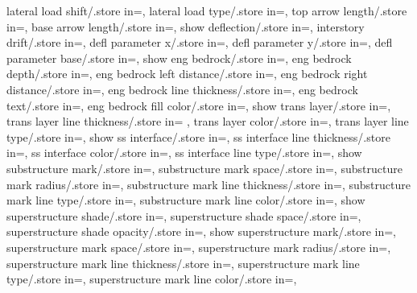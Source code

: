 {  lateral load shift/.store in=\latloadshift,
  lateral load type/.store in=\latloadtype,
  top arrow length/.store in=\toparrlen,
  base arrow length/.store in=\basearrlen,
  show deflection/.store in=\showdefl, 
  interstory drift/.store in=\drift,
  defl parameter x/.store in=,
  defl parameter y/.store in=,
  defl parameter base/.store in=,
  show eng bedrock/.store in=\showengbedrock,
  eng bedrock depth/.store in=\engbedrockdepth,
  eng bedrock left distance/.store in=\engbedrockleftdist,
  eng bedrock right distance/.store in=\engbedrockrightdist,
  eng bedrock line thickness/.store in=\engbedrocklinewidth,
  eng bedrock text/.store in=\engbedrocktext,
  eng bedrock fill color/.store in=\engbedrockfillcolor,
  show trans layer/.store in=\showtranslayer,
  trans layer line thickness/.store in= \translayerlinet,
  trans layer color/.store in=\translayercolor,
  trans layer line type/.store in=\translayerlinetype,
  show ss interface/.store in=\showssinter,
  ss interface line thickness/.store in=\ssinterlinet,
  ss interface color/.store in=\ssintercolor,
  ss interface line type/.store in=\ssinterlinetype,
  show substructure mark/.store in=\showmarkss,
  substructure mark space/.store in=\markssexspace,
  substructure mark radius/.store in=\markssrad,
  substructure mark line thickness/.store in=\marksslinet,
  substructure mark line type/.store in=\marksslinetype,
  substructure mark line color/.store in=\marksslinecolor,
  show superstructure shade/.store in=\showsupershade,
  superstructure shade space/.store in=\supershadespace,
  superstructure shade opacity/.store in=\supershadeopacity,
  show superstructure mark/.store in=\showmarksuper,
  superstructure mark space/.store in=\marksuperexspace,
  superstructure mark radius/.store in=\marksuperrad,
  superstructure mark line thickness/.store in=\marksuperlinet,
  superstructure mark line type/.store in=\marksuperlinetype,
  superstructure mark line color/.store in=\marksuperlinecolor,
}
